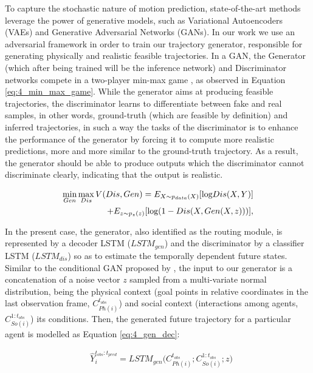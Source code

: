To capture the stochastic nature of motion prediction, state-of-the-art methods leverage the power of generative models, such as Variational Autoencoders (VAEs) and Generative Adversarial Networks (GANs). In our work we use an adversarial framework in order to train our trajectory generator, responsible for generating physically and realistic feasible trajectories. In a GAN, the Generator (which after being trained will be the inference network) and Discriminator networks compete in a two-player min-max game \cite{goodfellow2020generative}, as observed in Equation \ref{eq:4_min_max_game}. While the generator aims at producing feasible trajectories, the discriminator learns to differentiate between fake and real samples, in other words, ground-truth (which are feasible by definition) and inferred trajectories, in such a way the tasks of the discriminator is to enhance the performance of the generator by forcing it to compute more realistic predictions, more and more similar to the ground-truth trajectory. As a result, the generator should be able to produce outputs which the discriminator cannot discriminate clearly, indicating that the output is realistic. 

\begin{eqnarray}
	\label{eq:4_min_max_game}
	&&\hspace{-10mm} \min_{Gen} \max_{Dis} V(Dis, Gen)=E_{X \sim p_{data}(X)}[\mbox{log} Dis(X,Y)] \nonumber \\
	&&\hspace{15mm} + E_{z \sim p_z(z)}[\mbox{log} (1 - Dis(X, Gen(X,z)))],
\end{eqnarray}

In the present case, the generator, also identified as the routing module, is represented by a decoder LSTM  ($LSTM_{gen}$) and the discriminator by a classifier LSTM ($LSTM_{dis}$) so as to estimate the temporally dependent future states. Similar to the conditional GAN proposed by \cite{sadeghian2019sophie}, the input to our generator is a concatenation of a noise vector $z$ sampled from a multi-variate normal distribution, being the physical context (goal points in relative coordinates in the last observation frame, $C_{Ph(i)}^{t_{obs}}$) and social context (interactions among agents, $C_{So(i)}^{1:t_{obs}}$) its conditions. Then, the generated future trajectory for a particular agent is modelled as Equation \ref{eq:4_gen_dec}:

\begin{eqnarray}
	\label{eq:4_gen_dec}
	& \hat{Y}_i^{t_{obs}:t_{pred}} = LSTM_{gen}\big(C_{Ph(i)}^{t_{obs}}; C_{So(i)}^{1:t_{obs}}; z\big)
\end{eqnarray}

